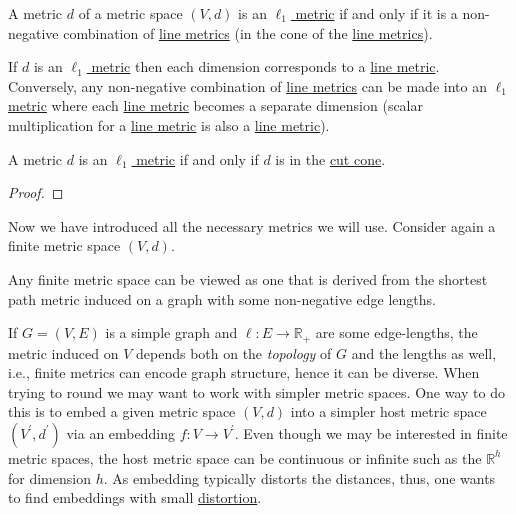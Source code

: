 \begin{claim}
	A metric \(d\) of a metric space \((V, d)\) is an \hyperref[def:l1-metric]{\(\ell _1\) metric} if and only if it is a non-negative combination of \hyperref[def:line-metric]{line metrics} (in the cone of the \hyperref[def:line-metric]{line metrics}).
\end{claim}
\begin{explanation}
	If \(d\) is an \hyperref[def:l1-metric]{\(\ell _1\) metric} then each dimension corresponds to a \hyperref[def:line-metric]{line metric}. Conversely, any non-negative combination of \hyperref[def:line-metric]{line metrics} can be made into an \hyperref[def:l1-metric]{\(\ell _1\) metric} where each \hyperref[def:line-metric]{line metric} becomes a separate dimension (scalar multiplication for a \hyperref[def:line-metric]{line metric} is also a \hyperref[def:line-metric]{line metric}).
\end{explanation}

\begin{lemma}
	A metric \(d\) is an \hyperref[def:l1-metric]{\(\ell _1\) metric} if and only if \(d\) is in the \hyperref[def:cut-cone]{cut cone}.
\end{lemma}
\begin{proof}
\end{proof}

Now we have introduced all the necessary metrics we will use. Consider again a finite metric space \((V, d)\).

\begin{claim}
	Any finite metric space can be viewed as one that is derived from the shortest path metric induced on a graph with some non-negative edge lengths.
\end{claim}

If \(G = (V, E)\) is a simple graph and \(\ell \colon E \to \mathbb{R} _+\) are some edge-lengths, the metric induced on \(V\) depends both on the \emph{topology} of \(G\) and the lengths as well, i.e., finite metrics can encode graph structure, hence it can be diverse. When trying to round we may want to work with simpler metric spaces. One way to do this is to embed a given metric space \((V, d)\) into a simpler host metric space \((V^{\prime} , d^{\prime} )\) via an embedding \(f \colon V \to V^{\prime} \). Even though we may be interested in finite metric spaces, the host metric space can be continuous or infinite such as the \(\mathbb{R} ^h\) for dimension \(h\). As embedding typically distorts the distances, thus, one wants to find embeddings with small \hyperref[def:distortion]{distortion}.

